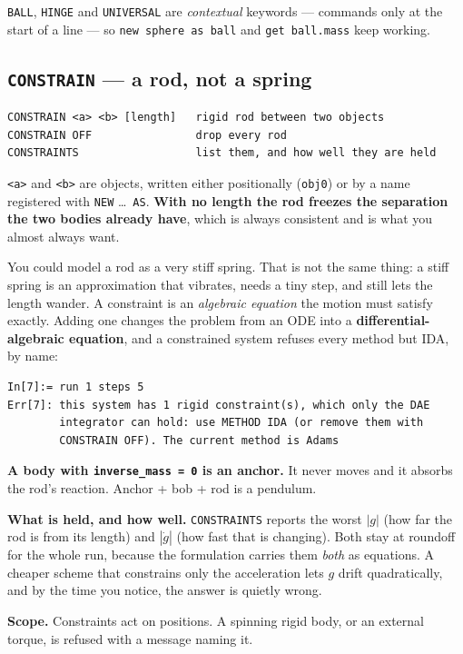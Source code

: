 \documentclass[11pt]{article}
\newcommand{\kw}[1]{\texttt{\uppercase{#1}}}
\newcommand{\code}[1]{\texttt{#1}}
\begin{document}
\kw{ball}, \kw{hinge} and \kw{universal} are \emph{contextual} keywords
--- commands only at the start of a line --- so \code{new sphere as ball}
and \code{get ball.mass} keep working.

\subsection{\kw{constrain} --- a rod, not a spring}

\begin{lstlisting}
CONSTRAIN <a> <b> [length]   rigid rod between two objects
CONSTRAIN OFF                drop every rod
CONSTRAINTS                  list them, and how well they are held
\end{lstlisting}

\code{<a>} and \code{<b>} are objects, written either positionally
(\code{obj0}) or by a name registered with \kw{new} \dots\ \kw{as}.
\textbf{With no length the rod freezes the separation the two bodies
already have}, which is always consistent and is what you almost always
want.

You could model a rod as a very stiff spring. That is not the same
thing: a stiff spring is an approximation that vibrates, needs a tiny
step, and still lets the length wander. A constraint is an
\emph{algebraic equation} the motion must satisfy exactly. Adding one
changes the problem from an ODE into a \textbf{differential-algebraic
equation}, and a constrained system refuses every method but IDA, by
name:

\begin{lstlisting}
In[7]:= run 1 steps 5
Err[7]: this system has 1 rigid constraint(s), which only the DAE
        integrator can hold: use METHOD IDA (or remove them with
        CONSTRAIN OFF). The current method is Adams
\end{lstlisting}

\textbf{A body with \code{inverse\_mass = 0} is an anchor.} It never
moves and it absorbs the rod's reaction. Anchor + bob + rod is a
pendulum.

\textbf{What is held, and how well.} \kw{constraints} reports the worst
$|g|$ (how far the rod is from its length) and $|\dot g|$ (how fast that
is changing). Both stay at roundoff for the whole run, because the
formulation carries them \emph{both} as equations. A cheaper scheme that
constrains only the acceleration lets $g$ drift quadratically, and by
the time you notice, the answer is quietly wrong.

\textbf{Scope.} Constraints act on positions. A spinning rigid body, or
an external torque, is refused with a message naming it.
\end{document}
